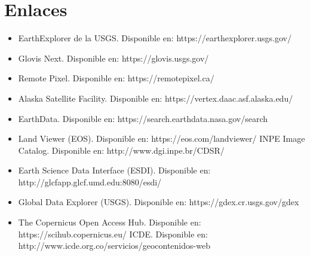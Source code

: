 \documentclass[12pt,hidelinks]{article}
\begin{document}
\section{Enlaces }
\begin{itemize}
    \item EarthExplorer de la USGS. Disponible en: https://earthexplorer.usgs.gov/
  \item Glovis Next. Disponible en: https://glovis.usgs.gov/
  \item Remote Pixel. Disponible en: https://remotepixel.ca/
  \item Alaska Satellite Facility. Disponible en: https://vertex.daac.asf.alaska.edu/
  \item EarthData. Disponible en: https://search.earthdata.nasa.gov/search
  \item Land Viewer (EOS). Disponible en: https://eos.com/landviewer/
INPE Image Catalog. Disponible en: http://www.dgi.inpe.br/CDSR/
  \item Earth Science Data Interface (ESDI). Disponible en: http://glcfapp.glcf.umd.edu:8080/esdi/
  \item Global Data Explorer (USGS). Disponible en: https://gdex.cr.usgs.gov/gdex
  \item The Copernicus Open Access Hub. Disponible en: https://scihub.copernicus.eu/
ICDE. Disponible en: http://www.icde.org.co/servicios/geocontenidos-web
\end{itemize}
\end{document}
